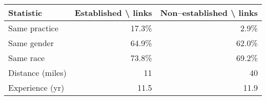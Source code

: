 \begin{table}[!h]
\centering
\begin{tabular}{lrr}
\toprule
Statistic & Established \textbackslash{} links & Non--established \textbackslash{} links\\
\midrule
Same practice & 17.3\% & 2.9\%\\
Same gender & 64.9\% & 62.0\%\\
Same race & 73.8\% & 69.2\%\\
Distance (miles) & 11 & 40\\
Experience (yr) & 11.5 & 11.9\\
\bottomrule
\end{tabular}
\end{table}
